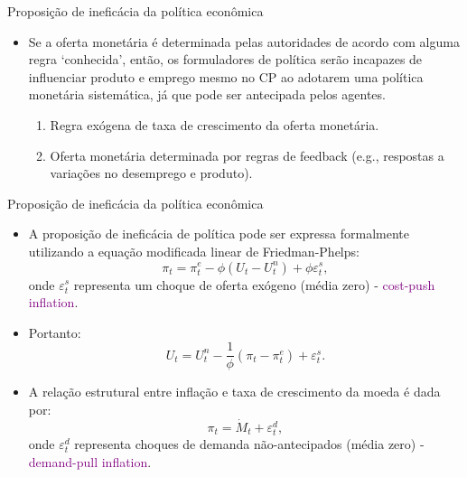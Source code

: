\documentclass[10pt]{beamer}
\begin{document}
\begin{frame}{Proposição de ineficácia da política econômica}
    \begin{itemize}
        \item Se a oferta monetária é determinada pelas autoridades de acordo com alguma regra `conhecida', então, os formuladores de política serão incapazes de influenciar produto e emprego mesmo no CP ao adotarem uma política monetária sistemática, já que pode ser antecipada pelos agentes.
        \bigskip
        \begin{enumerate}
            \item Regra exógena de taxa de crescimento da oferta monetária.
            \bigskip
            \item Oferta monetária determinada por regras de feedback (e.g., respostas a variações no desemprego e produto).
        \end{enumerate}
    \end{itemize}
\end{frame}

\begin{frame}{Proposição de ineficácia da política econômica}
    \begin{itemize}
        \item A proposição de ineficácia de política pode ser expressa formalmente utilizando a equação modificada linear de Friedman-Phelps:
        \begin{equation}
            \pi_t = \pi_t^e - \phi (U_t - U_t^n) + \phi \varepsilon_t^s,
            \label{eq7}
        \end{equation}
        onde $\varepsilon_t^s$ representa um choque de oferta exógeno (média zero) - \textcolor{purple}{cost-push inflation}.
        \bigskip
        \item Portanto:
        \begin{equation}
            U_t = U_t^n - \frac{1}{\phi}(\pi_t - \pi_t^e) + \varepsilon_t^s.
            \label{eq8}
        \end{equation}
        \bigskip
        \item A relação estrutural entre inflação e taxa de crescimento da moeda é dada por:
        \begin{equation}
            \pi_t = \dot{M}_t + \varepsilon_t^d,
            \label{eq9}
        \end{equation}
        onde $\varepsilon_t^d$ representa choques de demanda não-antecipados (média zero) - \textcolor{purple}{demand-pull inflation}.
    \end{itemize}
\end{frame}
\end{document}
